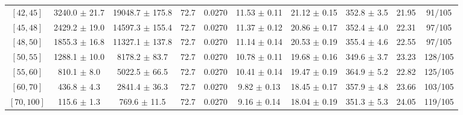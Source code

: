 \begin{tabular}{c||c|c|c|c|c|c|c||c|c}
$[42, 45]$ & 3240.0 $\pm$ 21.7 & 19048.7 $\pm$ 175.8 & 72.7 & 0.0270 & 11.53 $\pm$ 0.11 & 21.12 $\pm$ 0.15 & 352.8 $\pm$ 3.5 & 21.95 & 91/105\\
$[45, 48]$ & 2429.2 $\pm$ 19.0 & 14597.3 $\pm$ 155.4 & 72.7 & 0.0270 & 11.37 $\pm$ 0.12 & 20.86 $\pm$ 0.17 & 352.4 $\pm$ 4.0 & 22.31 & 97/105\\
$[48, 50]$ & 1855.3 $\pm$ 16.8 & 11327.1 $\pm$ 137.8 & 72.7 & 0.0270 & 11.14 $\pm$ 0.14 & 20.53 $\pm$ 0.19 & 355.4 $\pm$ 4.6 & 22.55 & 97/105\\
$[50, 55]$ & 1288.1 $\pm$ 10.0 & 8178.2 $\pm$ 83.7 & 72.7 & 0.0270 & 10.78 $\pm$ 0.11 & 19.68 $\pm$ 0.16 & 349.6 $\pm$ 3.7 & 23.23 & 128/105\\
$[55, 60]$ & 810.1 $\pm$ 8.0 & 5022.5 $\pm$ 66.5 & 72.7 & 0.0270 & 10.41 $\pm$ 0.14 & 19.47 $\pm$ 0.19 & 364.9 $\pm$ 5.2 & 22.82 & 125/105\\
$[60, 70]$ & 436.8 $\pm$ 4.3 & 2841.4 $\pm$ 36.3 & 72.7 & 0.0270 & 9.82 $\pm$ 0.13 & 18.45 $\pm$ 0.17 & 357.9 $\pm$ 4.8 & 23.66 & 103/105\\
$[70, 100]$ & 115.6 $\pm$ 1.3 & 769.6 $\pm$ 11.5 & 72.7 & 0.0270 & 9.16 $\pm$ 0.14 & 18.04 $\pm$ 0.19 & 351.3 $\pm$ 5.3 & 24.05 & 119/105\\
\end{tabular}

